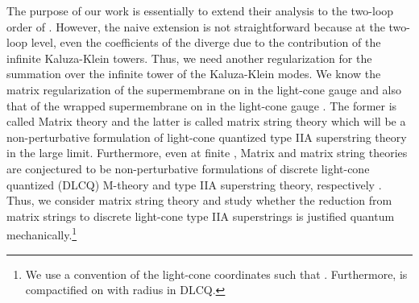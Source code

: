 \documentclass[a4paper,12pt]{article}
\begin{document}
The purpose of our work is essentially to extend their analysis to the
two-loop order of \coordHE{}.
However, the naive extension is not straightforward because at the
two-loop level, even the coefficients of the \coordHE{} diverge
due to the contribution of the infinite Kaluza-Klein towers.
Thus, we need another regularization for the summation over the
infinite tower of the Kaluza-Klein modes.
We know the matrix regularization of the supermembrane on
\coordHE{} in the light-cone gauge \cite{dHN} and also that of the
wrapped supermembrane on \coordHE{} in the light-cone gauge
\cite{SY}.
The former is called Matrix theory \cite{BFSS} and the latter is
called matrix string theory \cite{Mot,DVV} which will be a
non-perturbative formulation of light-cone quantized type IIA
superstring theory in the large \coordHE{} limit. Furthermore,
even at finite \coordHE{}, Matrix and matrix string theories
are conjectured to be non-perturbative formulations of discrete
light-cone quantized (DLCQ) M-theory and type IIA superstring theory,
respectively \cite{Sus,Sei,Sen}.
Thus, we consider matrix string theory and study whether
the reduction from matrix strings to discrete light-cone type IIA
superstrings is justified quantum mechanically.\footnote{We use a
convention of the light-cone coordinates such that \coordHE{}. Furthermore, \coordHE{} is compactified on \coordHE{} with
radius \coordHE{} in DLCQ.}

\end{document}
